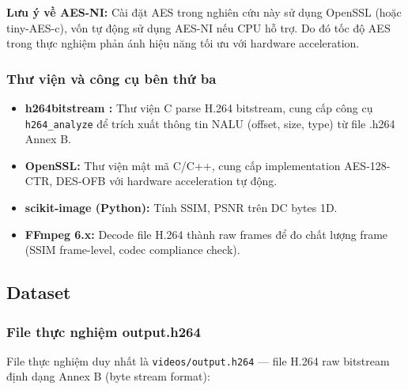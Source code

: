 \textbf{Lưu ý về AES-NI:} Cài đặt AES trong nghiên cứu này sử dụng OpenSSL
(hoặc tiny-AES-c), vốn tự động sử dụng AES-NI nếu CPU hỗ trợ. Do đó tốc độ
AES trong thực nghiệm phản ánh hiệu năng tối ưu với hardware acceleration.

\subsubsection{Thư viện và công cụ bên thứ ba}

\begin{itemize}
  \item \textbf{h264bitstream \cite{h264bitstream}:} Thư viện C parse H.264 bitstream,
        cung cấp công cụ \texttt{h264\_analyze} để trích xuất thông tin NALU
        (offset, size, type) từ file .h264 Annex B.

  \item \textbf{OpenSSL:} Thư viện mật mã C/C++, cung cấp implementation AES-128-CTR,
        DES-OFB với hardware acceleration tự động.

  \item \textbf{scikit-image (Python):} Tính SSIM, PSNR trên DC bytes 1D.

  \item \textbf{FFmpeg 6.x:} Decode file H.264 thành raw frames để đo chất lượng
        frame (SSIM frame-level, codec compliance check).
\end{itemize}

\subsection{Dataset}

\subsubsection{File thực nghiệm output.h264}

File thực nghiệm duy nhất là \texttt{videos/output.h264} --- file H.264 raw bitstream
định dạng Annex B (byte stream format):

